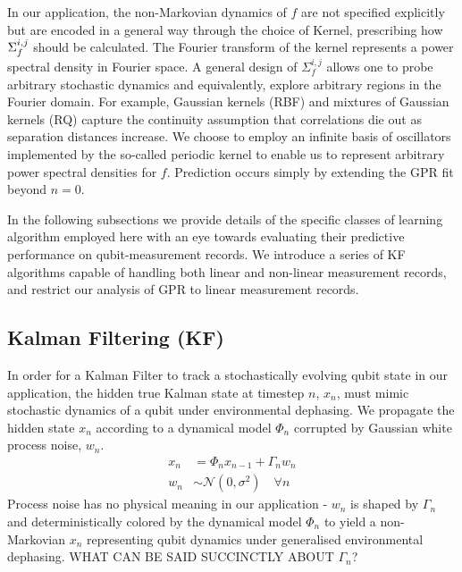 \documentclass[pra, reprint]{revtex4-1}
\begin{document}
In our application, the non-Markovian dynamics of $f$ are not specified explicitly but are encoded in a general way through the choice of Kernel, prescribing how $\Sigma_f^{i,j}$ should be calculated. The Fourier transform of the kernel represents a power spectral density in Fourier space. A general design of $\Sigma_f^{i, j}$ allows one to probe arbitrary stochastic dynamics and equivalently, explore arbitrary regions in the Fourier domain. For example, Gaussian kernels (RBF) and mixtures of Gaussian kernels (RQ) capture the continuity assumption that correlations die out as separation distances increase. We choose to employ an infinite basis of oscillators implemented by the so-called periodic kernel to enable us to represent arbitrary power spectral densities for $f$.  Prediction occurs simply by extending the GPR fit beyond $n=0$.

In the following subsections we provide details of the specific classes of learning algorithm employed here with an eye towards evaluating their predictive performance on qubit-measurement records.  We introduce a series of KF algorithms capable of handling both linear and non-linear measurement records, and restrict our analysis of GPR to linear measurement records. 



\subsection{ Kalman Filtering (KF)}\label{Subsec:KF}

In order for a Kalman Filter to track a stochastically evolving qubit state in our application, the hidden true Kalman state at timestep $n$, $x_n$, must mimic stochastic dynamics of a qubit under environmental dephasing. We propagate the hidden state $x_n$ according to a dynamical model $\Phi_n$ corrupted by Gaussian white process noise, $w_n$.  
\begin{align}
x_n & = \Phi_n x_{n-1} + \Gamma_n w_n \label{eqn:KF:dynamics} \\
w_n & \sim \mathcal{N}(0, \sigma^2) \quad \forall n 
\end{align}
Process noise has no physical meaning in our application - $w_n$ is shaped by $\Gamma_n$ and deterministically colored by the dynamical model $\Phi_n$ to yield a non-Markovian $x_n$ representing qubit dynamics under generalised environmental dephasing.  WHAT CAN BE SAID SUCCINCTLY ABOUT $\Gamma_n$?
\end{document}
